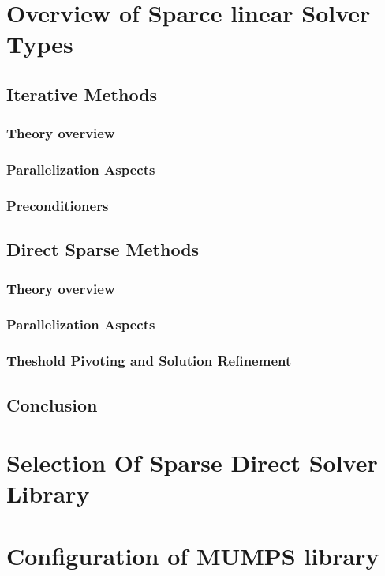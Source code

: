 \AtBeginSubsection[]{}
\AtBeginSection[]{}

\section{Overview of Sparce linear Solver Types}
  \subsection{Iterative Methods}
    \subsubsection{Theory overview}
    \subsubsection{Parallelization Aspects}
    \subsubsection{Preconditioners}
  
  \subsection{Direct Sparse Methods}
    \subsubsection{Theory overview}
    \subsubsection{Parallelization Aspects}
    \subsubsection{Theshold Pivoting and Solution Refinement}

  \subsection{Conclusion}
  
\section{Selection Of Sparse Direct Solver Library}
\section{Configuration of MUMPS library}
